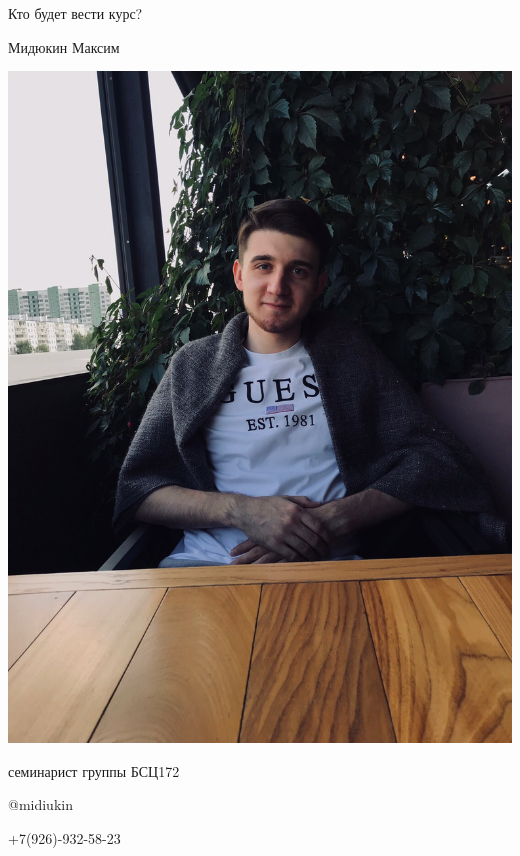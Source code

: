 \documentclass[notes,12pt, aspectratio=169]{beamer}
\newenvironment{wideitemize}{\itemize\addtolength{\itemsep}{10pt}}{\enditemize}
\begin{document}
\begin{frame}{Кто будет вести курс?}
	\begin{minipage}{0.45\textwidth}
		\centering Мидюкин Максим
		
		\centering \includegraphics[scale = 0.13]{max.jpg}
	\end{minipage}
	\hfill
	\begin{minipage}{0.45\textwidth}
		\begin{wideitemize}
			
			\item семинарист группы БСЦ172
			
			\item \faTelegram \: @midiukin
			
			\item \PhoneHandset  \: +7(926)-932-58-23
			
		\end{wideitemize} 
	\end{minipage}
\end{frame}
\end{document}
